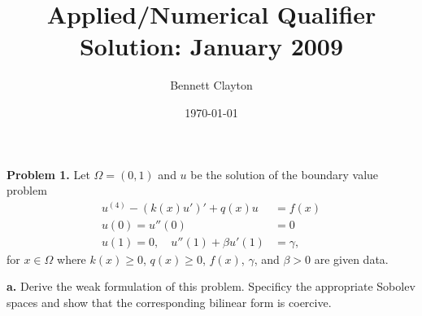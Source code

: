 \documentclass[11pt]{article}
\title{Applied/Numerical Qualifier Solution: January 2009}
\author{Bennett Clayton}
\affil{Texas A\&M University}
\date{\today}
\begin{document}
\maketitle

{\bf Problem 1.} Let $\Omega = (0,1)$ and $u$ be the solution of the boundary value problem
\begin{align}
    u^{(4)} - (k(x) u')' + q(x) u &= f(x) \label{pb1:eq1} \\
    u(0) = u''(0) &= 0 \\
    u(1) = 0, \quad u''(1) + \beta u'(1) &= \gamma,
\end{align}
for $x \in \Omega$ where $k(x) \geq 0 $, $q(x) \geq 0$, $f(x)$, $\gamma$, and $\beta > 0$ are given data. 

\vskip 1cm

{\bf a.} Derive the weak formulation of this problem.
Specificy the appropriate Sobolev spaces and show that the corresponding bilinear form is coercive.

\vskip 1cm
\end{document}

